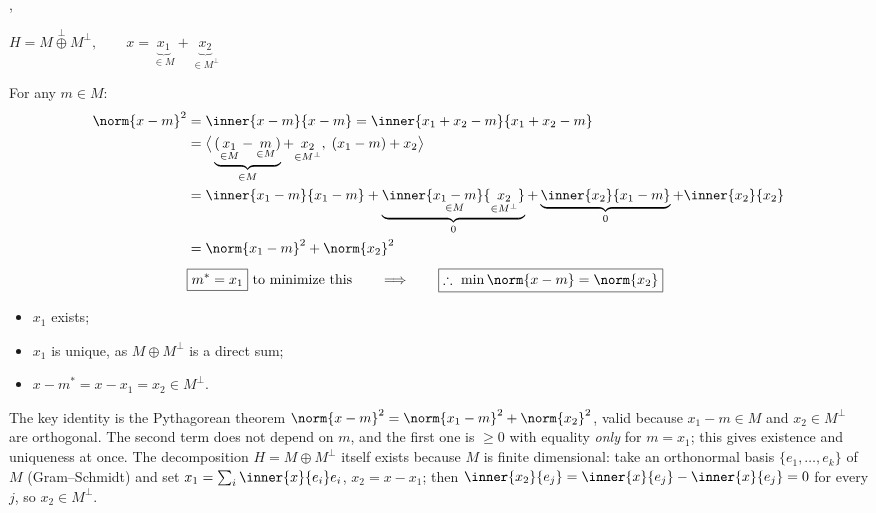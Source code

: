 \sep
\begin{keybox}[width=0.45\linewidth]
$H = M\overset{\perp}{\oplus} M^\perp, \qquad
x = \underbrace{x_1}_{\in M} + \underbrace{x_2}_{\in M^\perp}$
\end{keybox}
For any $m\in M$:
\begin{align*}
\norm{x-m}^2 &= \inner{x-m}{x-m} = \inner{x_1+x_2-m}{x_1+x_2-m}\\
&= \big\langle \underbrace{(\underset{\in M}{x_1}-\underset{\in M}{m})}_{\in M} + \underset{\in M^\perp}{x_2},\; (x_1-m)+x_2 \big\rangle\\
&= \inner{x_1-m}{x_1-m} + \underbrace{\inner{\underset{\in M}{x_1-m}}{\underset{\in M^\perp}{x_2}}}_{0} + \underbrace{\inner{x_2}{x_1-m}}_{0} + \inner{x_2}{x_2}\\
&= \norm{x_1-m}^2 + \norm{x_2}^2\\[4pt]
&\boxed{m^*=x_1} \text{ to minimize this}
\qquad\Longrightarrow\qquad
\boxed{\therefore\ \min \norm{x-m} = \norm{x_2}}
\end{align*}
\begin{itemize}[nosep]
  \item $x_1$ exists;
  \item $x_1$ is unique, as $M\oplus M^\perp$ is a direct sum;
  \item $x-m^* = x-x_1 = x_2\in M^\perp$.
\end{itemize}

\begin{insight}
The key identity is the Pythagorean theorem $\norm{x-m}^2 = \norm{x_1-m}^2 + \norm{x_2}^2$, valid because
$x_1-m\in M$ and $x_2\in M^\perp$ are orthogonal. The second term does not depend on $m$, and the first one is
$\ge 0$ with equality \emph{only} for $m=x_1$; this gives existence and uniqueness at once.
The decomposition $H = M\oplus M^\perp$ itself exists because $M$ is finite dimensional: take an orthonormal
basis $\{e_1,\dots,e_k\}$ of $M$ (Gram--Schmidt) and set $x_1=\sum_i \inner{x}{e_i}e_i$, $x_2 = x-x_1$;
then $\inner{x_2}{e_j} = \inner{x}{e_j}-\inner{x}{e_j} = 0$ for every $j$, so $x_2\in M^\perp$.
\end{insight}

